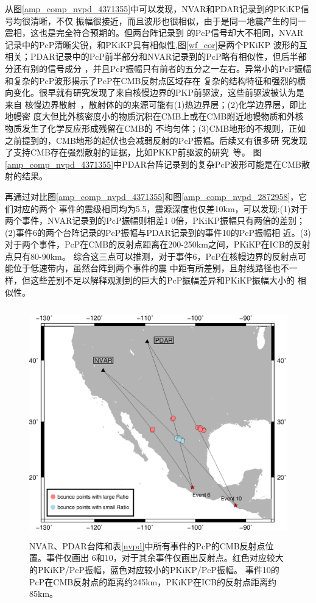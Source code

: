 从图\ref{amp_comp_nvpd_4371355}中可以发现，NVAR和PDAR记录到的PKiKP信号均很清晰，不仅
振幅很接近，而且波形也很相似，由于是同一地震产生的同一震相，这也是完全符合预期的。但两台阵记录到
的PcP信号却大不相同，NVAR记录中的PcP清晰尖锐，和PKiKP具有相似性,图\ref{wf_cor}是两个PKiKP
波形的互相关；PDAR记录中的PcP前半部分和NVAR记录到的PcP略有相似性，但后半部分还有别的信号成分
，并且PcP振幅只有前者的五分之一左右。异常小的PcP振幅和复杂的PcP波形揭示了PcP在CMB反射点区域存在
复杂的结构特征和强烈的横向变化。很早就有研究发现了来自核慢边界的PKP前驱波，这些前驱波被认为是来自
核慢边界散射~\citep{Bataille1988}，散射体的的来源可能有(1)热边界层；(2)化学边界层，即比地幔密
度大但比外核密度小的物质沉积在CMB上或在CMB附近地幔物质和外核物质发生了化学反应形成残留在CMB的
不均匀体；(3)CMB地形的不规则，正如之前提到的，CMB地形的起伏也会减弱反射的PcP振幅。后续又有很多研
究发现了支持CMB存在强烈散射的证据，比如PKKP前驱波的研究~\citep{Rost2010616}等。
图\ref{amp_comp_nvpd_4371355}中PDAR台阵记录到的复杂PcP波形可能是在CMB散射的结果。

再通过对比图\ref{amp_comp_nvpd_4371355}和图\ref{amp_comp_nvpd_2872958}，它们对应的两个
事件的震级相同均为5.5，震源深度也仅差10km，可以发现:(1)对于两个事件，NVAR记录到的PcP振幅则相差1
0倍，PKiKP振幅只有两倍的差别；(2)事件6的两个台阵记录的PcP振幅与PDAR记录到的事件10的PcP振幅相
近。(3)对于两个事件，PcP在CMB的反射点距离在200-250km之间，PKiKP在ICB的反射点只有80-90km。
综合这三点可以推测，对于事件6，PcP在核幔边界的反射点可能位于低速带内，虽然台阵到两个事件的震
中距有所差别，且射线路径也不一样，但这些差别不足以解释观测到的巨大的PcP振幅差异和PKiKP振幅大小的
相似性。

\begin{figure}
	\centering
	\includegraphics[width=12cm,height=10cm]{fig/chap4/cmb_bp_loc.eps}
	\caption{NVAR、PDAR台阵和表\ref{nvpd}中所有事件的PcP的CMB反射点位置。事件仅画出%
6和10，对于其余事件仅画出反射点。红色对应较大的PKiKP/PcP振幅，蓝色对应较小的PKiKP/PcP振幅。%
事件10的PcP在CMB反射点的距离约245km，PKiKP在ICB的反射点距离约85km。}
\end{figure}